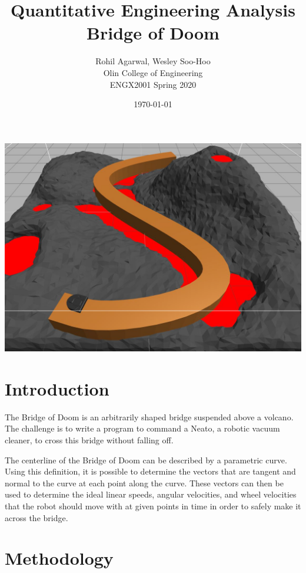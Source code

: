 

\title{Quantitative Engineering Analysis \\ Bridge of Doom}

\author{Rohil Agarwal, Wesley Soo-Hoo \\ Olin College of Engineering \\ ENGX2001 Spring 2020}
\date{\today}


\begin{titlepage}
\maketitle

\begin{center}
\includegraphics[width=.75\textwidth]{img/cover.png}
\end{center}
\end{titlepage}

\section{Introduction}
The Bridge of Doom is an arbitrarily shaped bridge suspended above a volcano. The challenge is to write a program to command a Neato, a robotic vacuum cleaner, to cross this bridge without falling off. 

The centerline of the Bridge of Doom can be described by a parametric curve. Using this definition, it is possible to determine the vectors that are tangent and normal to the curve at each point along the curve. These vectors can then be used to determine the ideal linear speeds, angular velocities, and wheel velocities that the robot should move with at given points in time in order to safely make it across the bridge.

\section{Methodology}
